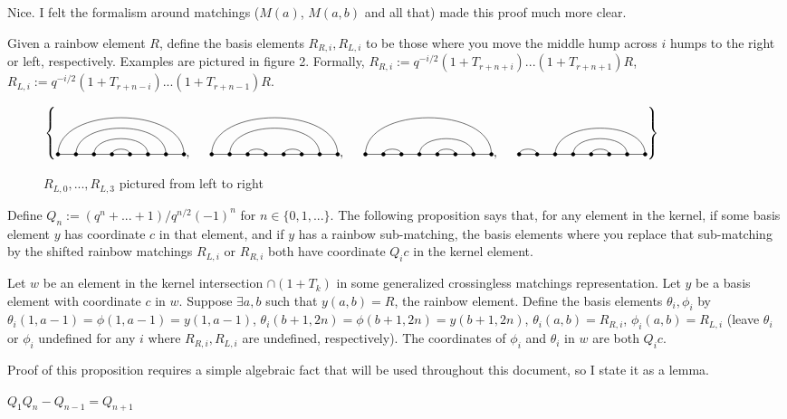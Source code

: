 \documentclass{amsart}
\begin{document}
{\color{magenta} Nice. I felt the formalism around matchings ($M(a)$, $M(a,b)$ and all that) made this proof much more clear.}

Given a rainbow element $R$, define the basis elements $R_{R,i},R_{L,i}$ to be those where you move the middle hump across $i$ humps to the right or left, respectively. Examples are pictured in figure 2. Formally, $R_{R,i}:=q^{-i/2}(1+T_{r+n+i})...(1+T_{r+n+1})R$, $R_{L,i}:=q^{-i/2}(1+T_{r+n-i})...(1+T_{r+n-1})R$.

\begin{figure}
		\def\cbasisspacing{5mm}
	$\cbr{
		\begin{gathered}
		\Matching{8}{1/8, 2/7, 3/6, 4/5}, \hspace{\cbasisspacing}
		\Matching{8}{1/8, 2/7, 3/4, 5/6}, \hspace{\cbasisspacing}
		\Matching{8}{1/8, 2/3, 4/7, 5/6}, \hspace{\cbasisspacing}
		\Matching{8}{1/2,3/8,4/7,5/6}
		\end{gathered}}$
	\caption{$R_{L,0},...,R_{L,3}$ pictured from left to right}
\end{figure}

 Define $Q_n:=(q^n+...+1)/q^{n/2}(-1)^n$ for $n\in \{0,1,...\}$. The following proposition says that, for any element in the kernel, if some basis element $y$ has coordinate $c$ in that element, and if $y$ has a rainbow sub-matching, the basis elements where you replace that sub-matching by the shifted rainbow matchings $R_{L,i}$ or $R_{R,i}$ both have coordinate $Q_ic$ in the kernel element.
 
\begin{proposition}
	Let $w$ be an element in the kernel intersection $\cap (1+T_k)$ in some generalized crossingless matchings representation. Let $y$ be a basis element with coordinate $c$ in $w$. Suppose $\exists a,b$ such that $y(a,b)=R$, the rainbow element. Define the basis elements $\theta_i,\phi_i$ by $\theta_i(1,a-1)=\phi(1,a-1)=y(1,a-1)$, $\theta_i(b+1,2n)=\phi(b+1,2n)=y(b+1,2n)$, $\theta_i(a,b)=R_{R,i}$, $\phi_i(a,b)=R_{L,i}$ (leave $\theta_i$ or $\phi_i$ undefined for any $i$ where $R_{R,i},R_{L,i}$ are undefined, respectively). The coordinates of $\phi_i$ and $\theta_i$ in $w$ are both $Q_ic$.
\end{proposition}

Proof of this proposition requires a simple algebraic fact that will be used throughout this document, so I state it as a lemma.

\begin{lemma}
	$Q_1Q_n-Q_{n-1}=Q_{n+1}$
\end{lemma}
\end{document}
